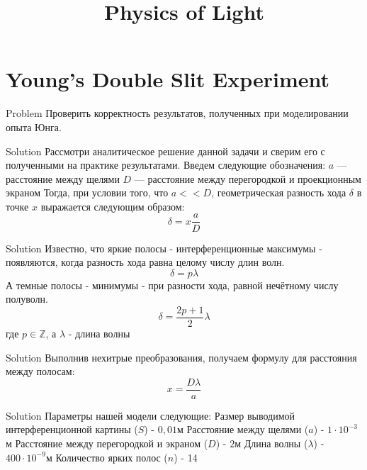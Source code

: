 \documentclass{beamer}
\title{Physics of Light}
\begin{document}
\begin{frame}
  \titlepage
\end{frame}

\section{Young's Double Slit Experiment}

\begin{frame}{Problem}
  Проверить корректность результатов, полученных при моделировании опыта Юнга.
\end{frame}

\begin{frame}{Solution}
  Рассмотри аналитическое решение данной задачи и сверим его с полученными на практике результатами.
  \newline
  \newline
  \pause
  Введем следующие обозначения:
  \newline
  \pause
  $a$ — расстояние между щелями
  \newline
  \pause
  $D$ — расстояние между перегородкой и проекционным экраном
  \newline
  \newline
  \pause
  Тогда, при условии того, что $a << D$, геометрическая разность хода $\delta$ в точке $x$
  выражается следующим образом:
  \[\delta = x \dfrac{a}{D}\] 
\end{frame}

\begin{frame}{Solution}
  Известно, что яркие полосы - интерференционные максимумы - появляются, когда разность хода
  равна целому числу длин волн.
  \[\delta = p \lambda\]
  \newline
  \pause
  А темные полосы - минимумы - при разности хода, равной нечётному числу полуволн.
  \[\delta = \dfrac{2p + 1}{2 } \lambda\]
  \pause
  где $p \in \mathbb{Z}$, а $\lambda$ - длина волны
\end{frame}

\begin{frame}{Solution}
  Выполнив нехитрые преобразования, получаем формулу для расстояния между полосам:
  \[x = \dfrac{D \lambda}{a}\]
\end{frame}

\begin{frame}{Solution}
  Параметры нашей модели следующие:
  \newline
  \newline
  \pause
  Размер выводимой интерференционной картины ($S$) - $0,01$м
  \newline
  \pause
  Расстояние между щелями ($a$) - $1 \cdot 10^{-3}$м
  \newline
  \pause
  Расстояние между перегородкой и экраном ($D$) - $2$м
  \newline
  \pause
  Длина волны ($\lambda$) - $400 \cdot 10^{-9}$м
  \newline
  \pause
  Количество ярких полос ($n$) - 14
\end{frame}
\end{document}
